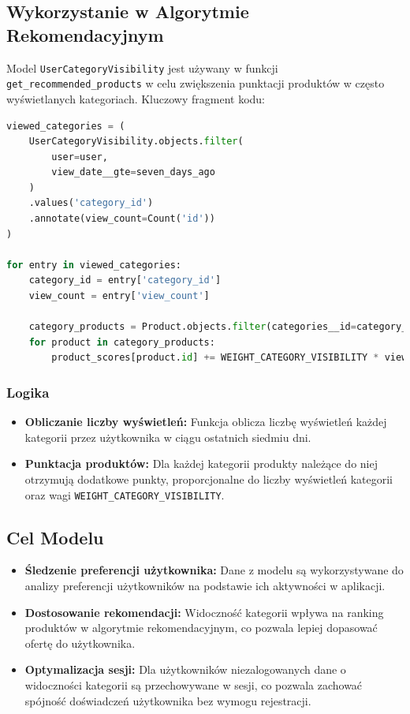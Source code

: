 \documentclass[12pt,a4paper,oneside]{article}
\theoremstyle{definition}
\numberwithin{equation}{section}
\begin{document}
\subsection{Wykorzystanie w Algorytmie Rekomendacyjnym}
Model \texttt{UserCategoryVisibility} jest używany w funkcji \texttt{get\_recommended\_products} w celu zwiększenia punktacji produktów w często wyświetlanych kategoriach. Kluczowy fragment kodu:
\begin{lstlisting}[language=Python]
viewed_categories = (
    UserCategoryVisibility.objects.filter(
        user=user,
        view_date__gte=seven_days_ago
    )
    .values('category_id')
    .annotate(view_count=Count('id'))
)

for entry in viewed_categories:
    category_id = entry['category_id']
    view_count = entry['view_count']

    category_products = Product.objects.filter(categories__id=category_id).distinct()
    for product in category_products:
        product_scores[product.id] += WEIGHT_CATEGORY_VISIBILITY * view_count
\end{lstlisting}

\subsubsection{Logika}
\begin{itemize}
    \item \textbf{Obliczanie liczby wyświetleń:} Funkcja oblicza liczbę wyświetleń każdej kategorii przez użytkownika w ciągu ostatnich siedmiu dni.
    \item \textbf{Punktacja produktów:} Dla każdej kategorii produkty należące do niej otrzymują dodatkowe punkty, proporcjonalne do liczby wyświetleń kategorii oraz wagi \texttt{WEIGHT\_CATEGORY\_VISIBILITY}.
\end{itemize}

\subsection{Cel Modelu}
\begin{itemize}
    \item \textbf{Śledzenie preferencji użytkownika:} Dane z modelu są wykorzystywane do analizy preferencji użytkowników na podstawie ich aktywności w aplikacji.
    \item \textbf{Dostosowanie rekomendacji:} Widoczność kategorii wpływa na ranking produktów w algorytmie rekomendacyjnym, co pozwala lepiej dopasować ofertę do użytkownika.
    \item \textbf{Optymalizacja sesji:} Dla użytkowników niezalogowanych dane o widoczności kategorii są przechowywane w sesji, co pozwala zachować spójność doświadczeń użytkownika bez wymogu rejestracji.
\end{itemize}
\end{document}
